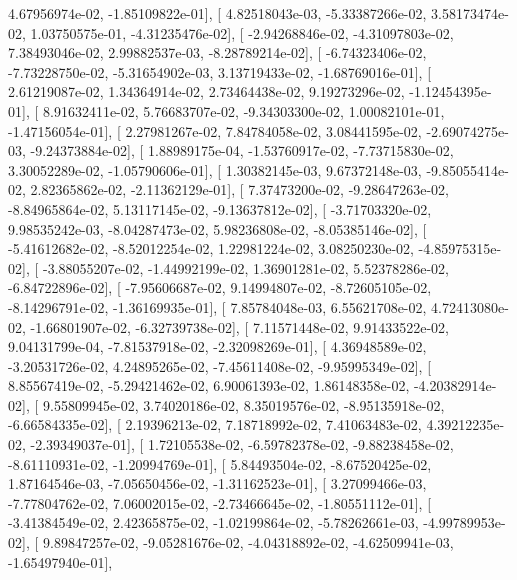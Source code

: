 \documentclass{article}
\begin{document}
          4.67956974e-02,  -1.85109822e-01],
       [  4.82518043e-03,  -5.33387266e-02,   3.58173474e-02,
          1.03750575e-01,  -4.31235476e-02],
       [ -2.94268846e-02,  -4.31097803e-02,   7.38493046e-02,
          2.99882537e-03,  -8.28789214e-02],
       [ -6.74323406e-02,  -7.73228750e-02,  -5.31654902e-03,
          3.13719433e-02,  -1.68769016e-01],
       [  2.61219087e-02,   1.34364914e-02,   2.73464438e-02,
          9.19273296e-02,  -1.12454395e-01],
       [  8.91632411e-02,   5.76683707e-02,  -9.34303300e-02,
          1.00082101e-01,  -1.47156054e-01],
       [  2.27981267e-02,   7.84784058e-02,   3.08441595e-02,
         -2.69074275e-03,  -9.24373884e-02],
       [  1.88989175e-04,  -1.53760917e-02,  -7.73715830e-02,
          3.30052289e-02,  -1.05790606e-01],
       [  1.30382145e-03,   9.67372148e-03,  -9.85055414e-02,
          2.82365862e-02,  -2.11362129e-01],
       [  7.37473200e-02,  -9.28647263e-02,  -8.84965864e-02,
          5.13117145e-02,  -9.13637812e-02],
       [ -3.71703320e-02,   9.98535242e-03,  -8.04287473e-02,
          5.98236808e-02,  -8.05385146e-02],
       [ -5.41612682e-02,  -8.52012254e-02,   1.22981224e-02,
          3.08250230e-02,  -4.85975315e-02],
       [ -3.88055207e-02,  -1.44992199e-02,   1.36901281e-02,
          5.52378286e-02,  -6.84722896e-02],
       [ -7.95606687e-02,   9.14994807e-02,  -8.72605105e-02,
         -8.14296791e-02,  -1.36169935e-01],
       [  7.85784048e-03,   6.55621708e-02,   4.72413080e-02,
         -1.66801907e-02,  -6.32739738e-02],
       [  7.11571448e-02,   9.91433522e-02,   9.04131799e-04,
         -7.81537918e-02,  -2.32098269e-01],
       [  4.36948589e-02,  -3.20531726e-02,   4.24895265e-02,
         -7.45611408e-02,  -9.95995349e-02],
       [  8.85567419e-02,  -5.29421462e-02,   6.90061393e-02,
          1.86148358e-02,  -4.20382914e-02],
       [  9.55809945e-02,   3.74020186e-02,   8.35019576e-02,
         -8.95135918e-02,  -6.66584335e-02],
       [  2.19396213e-02,   7.18718992e-02,   7.41063483e-02,
          4.39212235e-02,  -2.39349037e-01],
       [  1.72105538e-02,  -6.59782378e-02,  -9.88238458e-02,
         -8.61110931e-02,  -1.20994769e-01],
       [  5.84493504e-02,  -8.67520425e-02,   1.87164546e-03,
         -7.05650456e-02,  -1.31162523e-01],
       [  3.27099466e-03,  -7.77804762e-02,   7.06002015e-02,
         -2.73466645e-02,  -1.80551112e-01],
       [ -3.41384549e-02,   2.42365875e-02,  -1.02199864e-02,
         -5.78262661e-03,  -4.99789953e-02],
       [  9.89847257e-02,  -9.05281676e-02,  -4.04318892e-02,
         -4.62509941e-03,  -1.65497940e-01],
\end{document}
